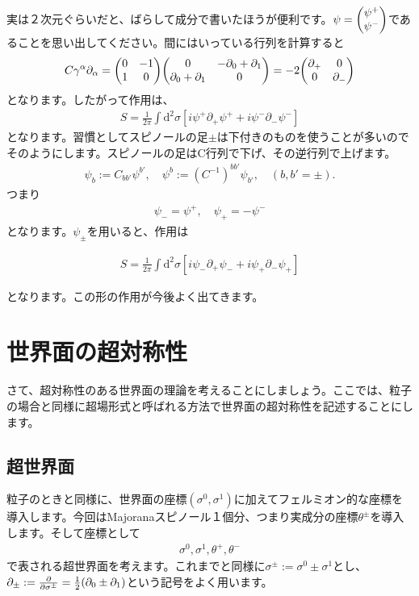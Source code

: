 \documentclass[report,paper=a4, fontsize=12pt, line_length=16cm, number_of_lines=33,dvipdfmx]{jlreq}
\newenvironment{important}{\begin{tcolorbox}[
  colback = white,
  colframe = red!35,
  boxrule = 2mm,
  fonttitle = \bfseries,
  after = \noindent] }{\end{tcolorbox}}
\numberwithin{equation}{chapter}
\numberwithin{equation}{section}
\newcommand{\del}{\partial}
\newcommand{\di}{\mathrm{d}}
\begin{document}
実は２次元ぐらいだと、ばらして成分で書いたほうが便利です。$\psi=\mqty(\psi^{+}\\ \psi^{-})$であることを思い出してください。間にはいっている行列を計算すると
\begin{align}
  C\gamma^{\alpha}\del_{\alpha}
  =\mqty(0 & -1 \\
         1 & 0 )
  \mqty(
    0 & -\del_{0}+\del_{1}\\
    \del_{0}+\del_{1}&0
  )
  =-2\mqty(
    \del_{+} & 0\\
    0 & \del_{-}
  )
\end{align}
となります。したがって作用は、
\begin{align}
  S=\frac{1}{2\pi}\int \di^2\sigma \left[ 
    i\psi^{+}\del_{+}\psi^{+}+i\psi^{-}\del_{-}\psi^{-}
   \right]
\end{align}
となります。習慣としてスピノールの足$\pm$は下付きのものを使うことが多いのでそのようにします。スピノールの足はC行列で下げ、その逆行列で上げます。
\begin{align}
  \psi_{b}:=C_{bb'}\psi^{b'},\quad \psi^{b}:=(C^{-1})^{bb'}\psi_{b'},\quad (b,b'=\pm).
\end{align}
つまり
\begin{align}
  \psi_{-}=\psi^{+},\quad \psi_{+}=-\psi^{-}
\end{align}
となります。$\psi_{\pm}$を用いると、作用は
\begin{important}
  \begin{align}
    S=\frac{1}{2\pi}\int \di^2\sigma \left[ 
      i\psi_{-}\del_{+}\psi_{-}+i\psi_{+}\del_{-}\psi_{+}
     \right]\label{free-fermion-action}
  \end{align}    
\end{important}
となります。この形の作用が今後よく出てきます。

\section{世界面の超対称性}
さて、超対称性のある世界面の理論を考えることにしましょう。ここでは、粒子の場合と同様に超場形式と呼ばれる方法で世界面の超対称性を記述することにします。

\subsection{超世界面}
粒子のときと同様に、世界面の座標$(\sigma^0,\sigma^1)$に加えてフェルミオン的な座標を導入します。今回はMajoranaスピノール１個分、つまり実成分の座標$\theta^{\pm}$を導入します。そして座標として
\begin{align}
  \sigma^{0},\sigma^{1},\theta^{+},\theta^{-}
\end{align}
で表される超世界面を考えます。これまでと同様に$\sigma^{\pm}:=\sigma^0\pm\sigma^1$とし、$\del_{\pm}:=\pdv{\sigma^{\pm}}=\frac{1}{2}(\del_{0}\pm\del_{1})$という記号をよく用います。
\end{document}
